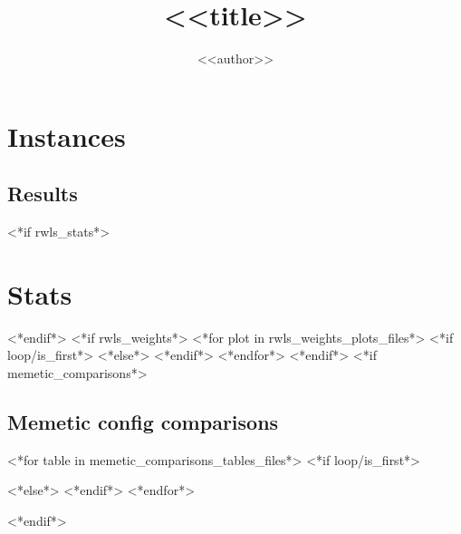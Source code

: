 \documentclass[12pt,a4paper,twoside]{article}
\title{<<title>>}
\author{<<author>>}
\date{\DTMusedate{generated} \DTMusetime{generated}}
\begin{document}
	\maketitle{}
	\tableofcontents{}
	\listoftables{}
	\newpage\section{Instances}
		
		
		
		
	\begin{landscape}
		\newpage\section{Results}
			
	\end{landscape}
<*if rwls_stats*>
	\newpage\section{Stats}
		
<*endif*>
<*if rwls_weights*>
	<*for plot in rwls_weights_plots_files*>
		<*if loop/is_first*>
%			
		<*else*>
		<*endif*>
	<*endfor*>
<*endif*>
<*if memetic_comparisons*>
	\begin{landscape}
		\newpage\section{Memetic config comparisons}
	<*for table in memetic_comparisons_tables_files*>
		<*if loop/is_first*>
			
		<*else*>
			\newpage
		<*endif*>
	<*endfor*>
	\end{landscape}
<*endif*>
\end{document}

